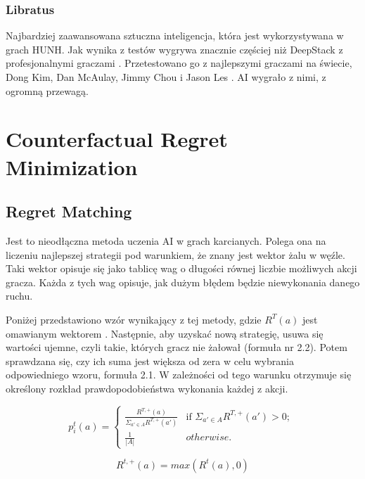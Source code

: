 \documentclass[12pt,oneside,a4paper]{report}
\begin{document}
\subsubsection{Libratus}

Najbardziej zaawansowana sztuczna inteligencja, która jest wykorzystywana w grach HUNH. Jak wynika z
testów wygrywa znacznie częściej niż DeepStack z profesjonalnymi graczami \cite{libratus}.
Przetestowano go z najlepszymi graczami na świecie, Dong Kim, Dan McAulay, Jimmy Chou 
i Jason Les \cite{libratus}. AI wygrało z nimi, z ogromną przewagą.




\section{Counterfactual Regret Minimization}

\subsection{Regret Matching}

Jest to nieodłączna metoda uczenia AI w grach karcianych. Polega ona na liczeniu najlepszej 
strategii pod warunkiem, że znany jest wektor żalu w węźle.
Taki wektor opisuje się jako tablicę wag o długości równej liczbie możliwych akcji gracza. Każda z 
tych wag opisuje, jak dużym błędem będzie niewykonania danego ruchu.


Poniżej przedstawiono wzór wynikający z tej metody, gdzie  
$R^{T}(a)$ jest omawianym wektorem \cite{CFR}. 
Następnie, aby uzyskać nową strategię, usuwa się wartości ujemne, czyli takie, których gracz nie
żałował (formuła nr 2.2).
Potem sprawdzana się, czy ich suma jest większa od zera w celu wybrania odpowiedniego wzoru, formuła
2.1.
W zależności od tego warunku otrzymuje się określony rozkład prawdopodobieństwa wykonania każdej z
akcji.


\begin{equation}
p^{t}_{i}\left( a \right) = \left\{ \begin{array}{ll}
      \frac{R^{T, \text{+}}\left(a\right)}{ \Sigma_{a' \in A} R^{T,\text{+}}\left(a'\right)} &
      \mbox{if $\Sigma_{a' \in A} R^{T,\text{+}}\left(a'\right) >
      0$};\\
      \frac{1}{|A|} & \mbox{$otherwise$}.\end{array} \right. \ 
\end{equation}

\vspace{1cm}
\begin{equation}
   R^{t,\text{+}}(a) = max(R^t(a),0)
\end{equation}
\end{document}
